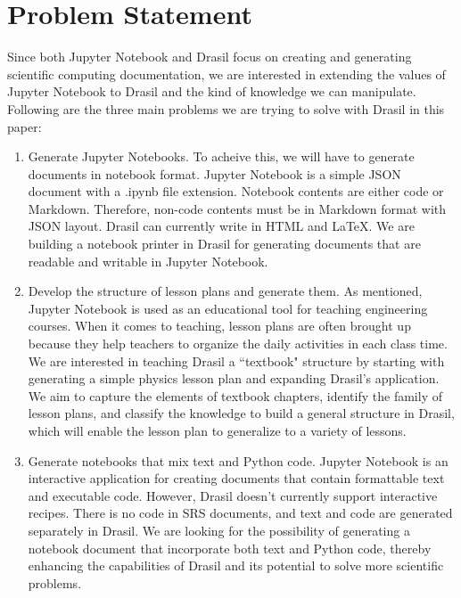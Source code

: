 \section{Problem Statement}
Since both Jupyter Notebook and Drasil focus on creating and generating 
scientific computing documentation, we are interested in extending the values 
of Jupyter Notebook to Drasil and the kind of knowledge we can manipulate. 
Following are the three main problems we are trying to solve with Drasil in 
this paper:

\begin{enumerate}
	\item Generate Jupyter Notebooks. To acheive this, we will have 
	to generate documents in notebook format. Jupyter Notebook is a simple 
	JSON document with a .ipynb file extension. Notebook contents are either 
	code or Markdown. Therefore, non-code contents must be in Markdown format 
	with JSON layout. Drasil can currently write in HTML and LaTeX. We are 
	building a notebook printer in Drasil for generating documents that are 
	readable and writable in Jupyter Notebook.
	\item Develop the structure of lesson plans and generate them. As 
	mentioned, Jupyter Notebook is used as an educational tool for teaching 
	engineering courses. When it comes to teaching, lesson plans are often 
	brought up because they help teachers to organize the daily activities 
	in each class time. We are interested in teaching Drasil a ``textbook" 
	structure by starting with generating a simple physics lesson plan and 
	expanding Drasil's application. We aim to capture the elements of 
	textbook chapters, identify the family of lesson plans, and classify the 
	knowledge to build a general structure in Drasil, which will enable the 
	lesson plan to generalize to a variety of lessons.
	\item Generate notebooks that mix text and Python code. Jupyter Notebook is 
	an interactive application for creating documents that contain formattable 
	text and executable code. However, Drasil doesn't currently support 
	interactive recipes. There is no code in SRS documents, and text and code 
	are generated separately in Drasil. We are looking for the possibility of 
	generating a notebook document that incorporate both text and Python code, 
	thereby	enhancing the capabilities of Drasil and its potential to solve 
	more scientific problems.
\end{enumerate}

